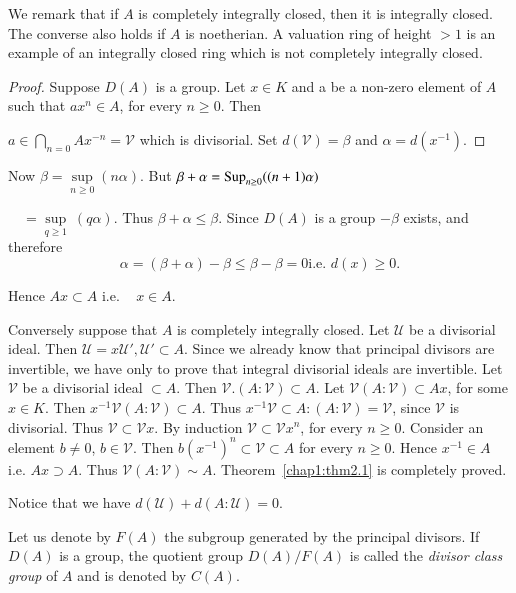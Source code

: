   We remark that if $A$ is completely integrally closed, then it is
  integrally closed. The converse also holds if $A$ is noetherian. A
  valuation ring of height $>1$ is an example of an integrally closed
  ring which is not completely integrally closed. 
  
\begin{proof} 
Suppose $D(A)$ is a group. Let $x \in K$ and a be a non-zero element of $A$
such that $ax^n \in A$, for every $n \geq 0$. Then 

\noindent
  $a \in \bigcap\limits_{n = 0} Ax^{-n} = \mathscr{V}$ which is
divisorial. Set $d(\mathscr{V}) = \beta $ and $\alpha = d(x^{-1})$. 
  \end{proof}  
  
\noindent
Now $\beta = \sup\limits_{n \ge 0} (n \alpha)$. But $\beta + \alpha =
\operatorname{Sup}\limits_{n \ge 0}((n + 1) \alpha)$ 
  
  \quad ~~$= \sup\limits_{q \ge 1} ~ (q \alpha)$. Thus $\beta +
  \alpha \leq \beta$. Since $D(A)$ is a group $-\beta$\pageoriginale
  exists, and   therefore 
  $$
  \alpha = (\beta + \alpha) - \beta \le \beta - \beta = 0\text{
    i.e. } d(x) \ge 0. 
  $$
  
  \noindent
  Hence $Ax \subset A$ i.e. ~ $x \in A$.
  
  \noindent
  Conversely suppose that $A$ is completely integrally closed. Let
  $\mathscr{U}$ be a divisorial ideal. Then $\mathscr{U} = x
  \mathscr{U}', \mathscr{U}' \subset A$. Since we already know that
  principal divisors are invertible, we have only to prove that
  integral divisorial ideals are invertible. Let $\mathscr{V}$ be a
  divisorial ideal $\subset A$. Then $\mathscr{V} . (A : \mathscr{V})
  \subset A$. Let $\mathscr{V} (A:  \mathscr{V}) \subset A x$, for
  some $x \in K$. Then $x^{-1} \mathscr{V} (A : \mathscr{V}) \subset
  A$. Thus $x^{-1} \mathscr{V} \subset A : (A : \mathscr{V}) =
  \mathscr{V}$, since $\mathscr{V}$ is divisorial. Thus $\mathscr{V}
  \subset \mathscr{V} x$. By induction $\mathscr{V} \subset
  \mathscr{V} x^n$, for every $n \ge 0$. Consider an element $b
  \neq 0$, $b \in \mathscr{V}$. Then $b (x^{-1})^n \subset
  \mathscr{V} \subset A$ for every $n \ge 0$. Hence $x^{-1} \in A$
  i.e. $Ax \supset A$. Thus $\mathscr{V} (A : \mathscr{V}) \sim
  A$. Theorem~\ref{chap1:thm2.1} is completely proved.  
  
\noindent
Notice that we have $d(\mathscr{U}) + d(A : \mathscr{U}) = 0$. 
  
Let us denote by $F(A)$ the subgroup generated by the principal
divisors. If $D(A)$ is a group, the quotient group $D(A)/F(A)$ is
called the \textit{divisor class group} of $A$ and is denoted by
$C(A)$. 
  
